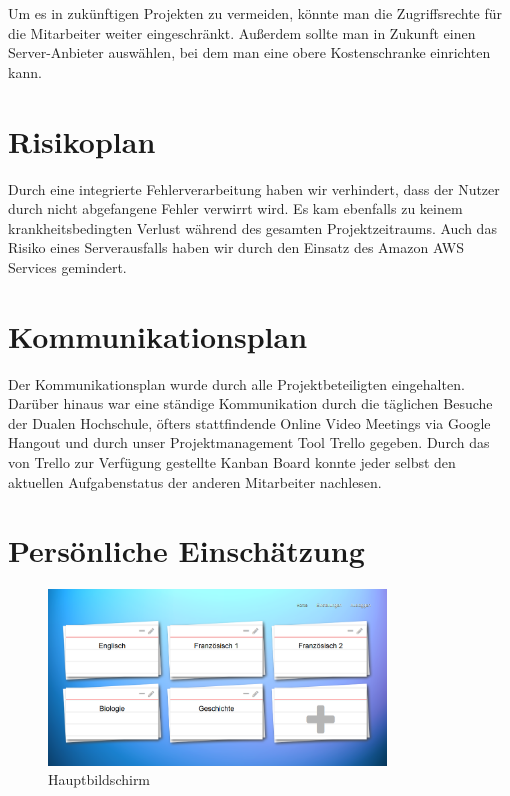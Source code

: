\documentclass{article}
\begin{document}
Um es in zukünftigen Projekten zu vermeiden, könnte man die Zugriffsrechte für die Mitarbeiter weiter eingeschränkt. Außerdem sollte man in Zukunft einen Server-Anbieter auswählen, bei dem man eine obere Kostenschranke einrichten kann.

\section{Risikoplan}

Durch eine integrierte Fehlerverarbeitung haben wir verhindert, dass der Nutzer durch nicht abgefangene Fehler verwirrt wird. Es kam ebenfalls zu keinem krankheitsbedingten Verlust während des gesamten Projektzeitraums. Auch das Risiko eines Serverausfalls haben wir durch den Einsatz des Amazon AWS Services gemindert.

\section{Kommunikationsplan}

Der Kommunikationsplan wurde durch alle Projektbeteiligten eingehalten. Darüber hinaus war eine ständige Kommunikation durch die täglichen Besuche der Dualen Hochschule, öfters stattfindende Online Video Meetings via Google Hangout und durch unser Projektmanagement Tool Trello gegeben. Durch das von Trello zur Verfügung gestellte Kanban Board konnte jeder selbst den aktuellen Aufgabenstatus der anderen Mitarbeiter nachlesen. 

\section{Persönliche Einschätzung}

\begin{figure}[H]
    \centering
    \includegraphics[width=0.8\textwidth]{images/overview.png}
    \caption{Hauptbildschirm}
    \label{fig:dashboard}
\end{figure}
\end{document}
